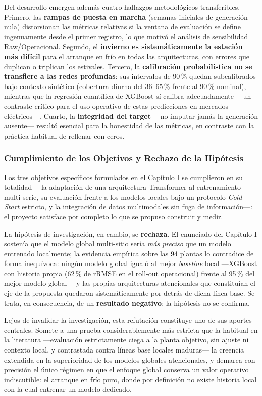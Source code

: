 Del desarrollo emergen además cuatro hallazgos metodológicos transferibles. Primero, las \textbf{rampas de puesta en marcha} (semanas iniciales de generación nula) distorsionan las métricas relativas si la ventana de evaluación se define ingenuamente desde el primer registro, lo que motivó el análisis de sensibilidad Raw/Operacional. Segundo, el \textbf{invierno es sistemáticamente la estación más difícil} para el arranque en frío en todas las arquitecturas, con errores que duplican o triplican los estivales. Tercero, la \textbf{calibración probabilística no se transfiere a las redes profundas}: sus intervalos de 90\,\% quedan subcalibrados bajo contexto sintético (cobertura diurna del 36--65\,\% frente al 90\,\% nominal), mientras que la regresión cuantílica de XGBoost sí calibra adecuadamente —un contraste crítico para el uso operativo de estas predicciones en mercados eléctricos—. Cuarto, la \textbf{integridad del target} —no imputar jamás la generación ausente— resultó esencial para la honestidad de las métricas, en contraste con la práctica habitual de rellenar con ceros.

\subsubsection{Cumplimiento de los Objetivos y Rechazo de la Hipótesis}

Los tres objetivos específicos formulados en el Capítulo I se cumplieron en su totalidad —la adaptación de una arquitectura Transformer al entrenamiento multi-serie, su evaluación frente a los modelos locales bajo un protocolo \textit{Cold-Start} estricto, y la integración de datos multimodales sin fuga de información—: el proyecto satisface por completo lo que se propuso construir y medir.

La hipótesis de investigación, en cambio, se \textbf{rechaza}. El enunciado del Capítulo I sostenía que el modelo global multi-sitio sería \textit{más preciso} que un modelo entrenado localmente; la evidencia empírica sobre las 94 plantas lo contradice de forma inequívoca: ningún modelo global igualó al mejor \textit{baseline} local —XGBoost con historia propia (62\,\% de rRMSE en el roll-out operacional) frente al 95\,\% del mejor modelo global— y las propias arquitecturas atencionales que constituían el eje de la propuesta quedaron sistemáticamente por detrás de dicha línea base. Se trata, en consecuencia, de un \textbf{resultado negativo}: la hipótesis no se confirma.

Lejos de invalidar la investigación, esta refutación constituye uno de sus aportes centrales. Somete a una prueba considerablemente más estricta que la habitual en la literatura —evaluación estrictamente ciega a la planta objetivo, sin ajuste ni contexto local, y contrastada contra líneas base locales maduras— la creencia extendida en la superioridad de los modelos globales atencionales, y demarca con precisión el único régimen en que el enfoque global conserva un valor operativo indiscutible: el arranque en frío puro, donde por definición no existe historia local con la cual entrenar un modelo dedicado.

